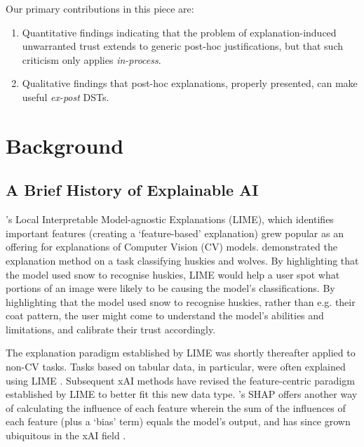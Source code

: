 Our primary contributions in this piece are:

\begin{enumerate}
    \item Quantitative findings indicating that the problem of explanation-induced unwarranted trust extends to generic post-hoc justifications, but that such criticism only applies \emph{in-process}.
    \item Qualitative findings that post-hoc explanations, properly presented, can make useful \emph{ex-post} DSTs.
\end{enumerate}

\section{Background}
\subsection{A Brief History of Explainable AI}\label{ssec:history}
\textcite{ribeiro_why_2016}'s Local Interpretable Model-agnostic Explanations (LIME), which identifies important features (creating a `feature-based' explanation) grew popular as an offering for explanations of Computer Vision (CV) models. \textcite{ribeiro_why_2016} demonstrated the explanation method on a task classifying huskies and wolves. By highlighting that the model used snow to recognise huskies, LIME would help a user spot what portions of an image were likely to be causing the model's classifications. By highlighting that the model used snow to recognise huskies, rather than e.g. their coat pattern, the user might come to understand the model's abilities and limitations, and calibrate their trust accordingly.

The explanation paradigm established by LIME was shortly thereafter applied to non-CV tasks. Tasks based on tabular data, in particular, were often explained using LIME \cite{zerilli_explaining_2020}. Subsequent xAI methods have revised the feature-centric paradigm established by LIME to better fit this new data type. \textcite{lundberg_unified_2017}'s SHAP offers another way of calculating the influence of each feature wherein the sum of the influences of each feature (plus a `bias' term) equals the model's output, and has since grown ubiquitous in the xAI field \cite{weerts_human-grounded_2019}.

